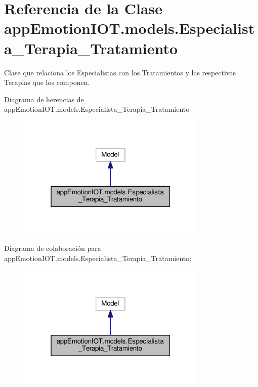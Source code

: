 \hypertarget{classappEmotionIOT_1_1models_1_1Especialista__Terapia__Tratamiento}{}\section{Referencia de la Clase app\+Emotion\+I\+O\+T.\+models.\+Especialista\+\_\+\+Terapia\+\_\+\+Tratamiento}
\label{classappEmotionIOT_1_1models_1_1Especialista__Terapia__Tratamiento}


Clase que relaciona los Especialistas con los Tratamientos y las respectivas Terapias que los componen.  




Diagrama de herencias de app\+Emotion\+I\+O\+T.\+models.\+Especialista\+\_\+\+Terapia\+\_\+\+Tratamiento
\nopagebreak
\begin{figure}[H]
\begin{center}
\leavevmode
\includegraphics[width=256pt]{classappEmotionIOT_1_1models_1_1Especialista__Terapia__Tratamiento__inherit__graph}
\end{center}
\end{figure}


Diagrama de colaboración para app\+Emotion\+I\+O\+T.\+models.\+Especialista\+\_\+\+Terapia\+\_\+\+Tratamiento\+:
\nopagebreak
\begin{figure}[H]
\begin{center}
\leavevmode
\includegraphics[width=256pt]{classappEmotionIOT_1_1models_1_1Especialista__Terapia__Tratamiento__coll__graph}
\end{center}
\end{figure}

